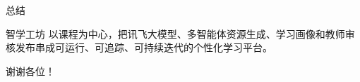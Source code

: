 \documentclass{beamer}
\begin{document}
\begin{frame}{总结}
\begin{block}{智学工坊}
以课程为中心，把讯飞大模型、多智能体资源生成、学习画像和教师审核发布串成可运行、可追踪、可持续迭代的个性化学习平台。
\end{block}
\vspace{0.8cm}
\begin{center}
谢谢各位！
\end{center}
\end{frame}
\end{document}
